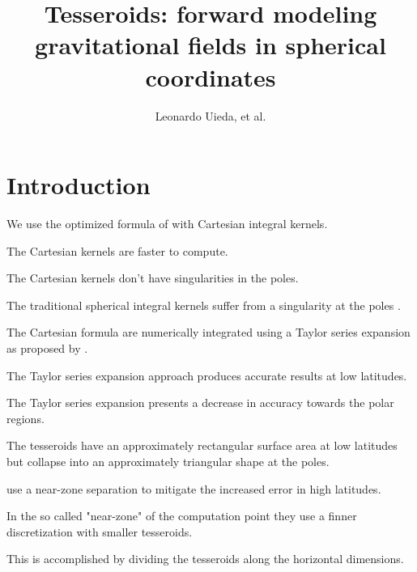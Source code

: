 \documentclass[paper,twocolumn]{geophysics}
\begin{document}
\title{
Tesseroids: forward modeling gravitational fields in spherical coordinates
}

\author{
    Leonardo Uieda\footnotemark[1]\footnotemark[2],
    et al.
}

\address{
    \footnotemark[1]Universidade do Estado do Rio de Janeiro,
    Rio de Janeiro, Brazil.
    email: leouieda@gmail.com
}

\maketitle


\begin{abstract}
\end{abstract}

\section{Introduction}


We use the optimized formula of \citet{Grombein2013} with Cartesian integral
kernels.

The Cartesian kernels are faster to compute.

The Cartesian kernels don't have singularities in the poles.

The traditional spherical integral kernels suffer from a singularity at the
poles \citep{Heck2007, Wild-Pfeiffer2008}.

The Cartesian formula are numerically integrated using a Taylor series
expansion as proposed by \citet{Heck2007}.

The Taylor series expansion approach produces accurate results at low
latitudes.

The Taylor series expansion presents a decrease in accuracy towards the polar
regions.

The tesseroids have an approximately rectangular surface area at low latitudes
but collapse into an approximately triangular shape at the poles.

\citet{Grombein2013} use a near-zone separation to mitigate the increased error
in high latitudes.

In the so called "near-zone" of the computation point they use a finner
discretization with smaller tesseroids.

This is accomplished by dividing the tesseroids along the horizontal
dimensions.
\end{document}
